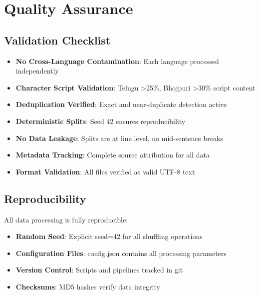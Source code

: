 \documentclass[11pt,a4paper]{article}
\begin{document}
\section{Quality Assurance}

\subsection{Validation Checklist}

\begin{itemize}
    \item[\checkmark] \textbf{No Cross-Language Contamination}: Each language processed independently
    \item[\checkmark] \textbf{Character Script Validation}: Telugu >25\%, Bhojpuri >30\% script content
    \item[\checkmark] \textbf{Deduplication Verified}: Exact and near-duplicate detection active
    \item[\checkmark] \textbf{Deterministic Splits}: Seed 42 ensures reproducibility
    \item[\checkmark] \textbf{No Data Leakage}: Splits are at line level, no mid-sentence breaks
    \item[\checkmark] \textbf{Metadata Tracking}: Complete source attribution for all data
    \item[\checkmark] \textbf{Format Validation}: All files verified as valid UTF-8 text
\end{itemize}

\subsection{Reproducibility}

All data processing is fully reproducible:

\begin{itemize}
    \item \textbf{Random Seed}: Explicit seed=42 for all shuffling operations
    \item \textbf{Configuration Files}: config.json contains all processing parameters
    \item \textbf{Version Control}: Scripts and pipelines tracked in git
    \item \textbf{Checksums}: MD5 hashes verify data integrity
\end{itemize}
\end{document}
